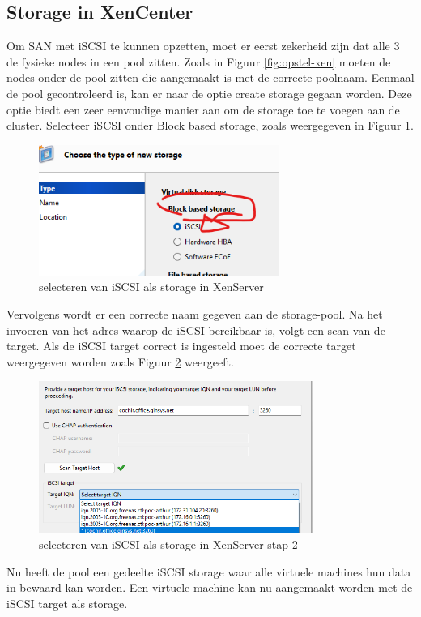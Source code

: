 \subsection{Storage in XenCenter}%
\label{sec:Storage-technisch-xen}
Om SAN met iSCSI te kunnen opzetten, moet er eerst zekerheid zijn dat alle 3 de fysieke nodes in een pool zitten. Zoals in Figuur \ref{fig:opstel-xen} moeten de nodes onder de pool zitten die aangemaakt is met de correcte poolnaam.
Eenmaal de pool gecontroleerd is, kan er naar de optie create storage gegaan worden. Deze optie biedt een zeer eenvoudige manier aan om de storage toe te voegen aan de cluster.
Selecteer iSCSI onder Block based storage, zoals weergegeven in Figuur \ref{fig:iscsi-xen}.
\begin{figure}[H]
  \centering
  \includegraphics[width=0.7\textwidth]{../poc/iscsi-xen.png}
  \caption{selecteren van iSCSI als storage in XenServer}
  \label{fig:iscsi-xen}
\end{figure}
Vervolgens wordt er een correcte naam gegeven aan de storage-pool. Na het invoeren van het adres waarop de iSCSI bereikbaar is, volgt een scan van de target. Als de iSCSI target correct is ingesteld moet de correcte target weergegeven worden zoals Figuur \ref{fig:cochir-nas-xen} weergeeft.
\begin{figure}[H]
  \centering
  \includegraphics[width=0.8\textwidth]{../poc/cochir-nas-xen.png}
  \caption{selecteren van iSCSI als storage in XenServer stap 2}
  \label{fig:cochir-nas-xen}
\end{figure}
Nu heeft de pool een gedeelte iSCSI storage waar alle virtuele machines hun data in bewaard kan worden.
Een virtuele machine kan nu aangemaakt worden met de iSCSI target als storage.
